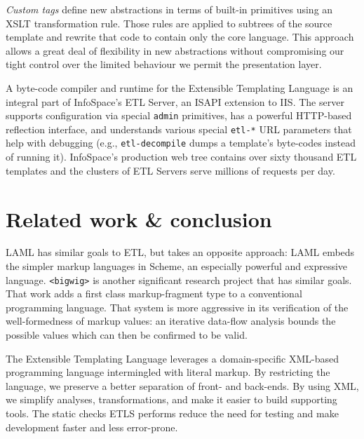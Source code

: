 \documentclass{www2003-submission}
\newcommand{\smtexttt}[1]{{\small\texttt{#1}}}
\newcommand{\etl}{ETL}
\begin{document}
\emph{Custom tags} define new abstractions in terms of 
built-in primitives using an XSLT transformation rule.  Those
rules are applied to subtrees of the source template and rewrite
that code to contain only the core language.  This approach allows a
great deal of flexibility in new abstractions without compromising our
tight control over the limited behaviour we permit the presentation
layer.

A byte-code compiler and runtime for the Extensible Templating
Language is an integral part of InfoSpace's \etl{} Server,
an ISAPI extension to IIS.  The server supports configuration 
via special \smtexttt{admin} primitives, has a powerful
HTTP-based reflection interface, and understands various special
\smtexttt{etl-*} URL parameters that help with debugging (e.g., 
\smtexttt{etl-decompile} dumps a template's byte-codes
instead of running it).  InfoSpace's production web tree
contains over sixty thousand \etl{} templates and the clusters of
\etl{} Servers serve millions of requests per day.

\section{Related work \& conclusion}
\label{sec-related-work}

LAML has similar goals to \etl{}, but takes an opposite approach: LAML
embeds the simpler markup languages in Scheme, an especially powerful
and expressive language.  \verb|<bigwig>| is another significant
research project that has similar goals.  That work adds a first class
markup-fragment type to a conventional programming language.  That
system is more aggressive in its verification of the well-formedness
of markup values: an iterative data-flow analysis bounds the possible
values which can then be confirmed to be valid.

The Extensible Templating Language leverages a domain-specific
XML-based programming language intermingled with literal markup.  By
restricting the language, we preserve a better separation of front-
and back-ends. By using XML, we simplify analyses, transformations,
and make it easier to build supporting tools.  The static checks ETLS
performs reduce the need for testing and make development faster and
less error-prone.



\balancecolumns

\end{document}
